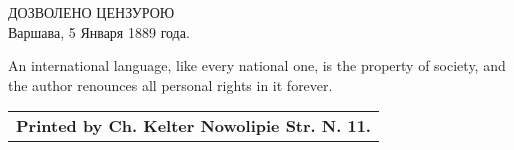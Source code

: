 \vspace*{12em}

\begin{table}[h]
\begin{center}
{ДОЗВОЛЕНО ЦЕНЗУРОЮ \\[1ex]
Варшава, 5 Января 1889 года.}
\end{center}
\end{table}

\vspace{5em}

{\small \leftpointright An international language, like every national one, is the property of society, and the author renounces all personal rights in it forever.}


\vspace{5em}

\begin{flushright}
\begin{tabular}{r}
\hline
\bf\footnotesize Printed by Ch. Kelter Nowolipie Str. N. 11.
\end{tabular}
\end{flushright}

\setlength{\parskip}{0pt}

\vspace*{\fill}
